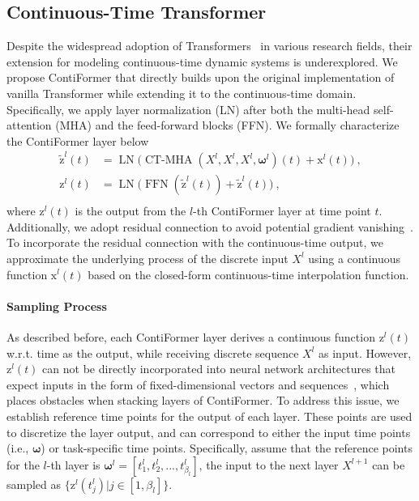 \documentclass{article}
\begin{document}
\subsection{Continuous-Time Transformer}

Despite the widespread adoption of Transformers~\cite{vaswani2017attention} in various research fields, their extension for modeling continuous-time dynamic systems is underexplored.
We propose ContiFormer that directly builds upon the original implementation of vanilla Transformer while extending it to the continuous-time domain.
Specifically, we apply layer normalization (LN) after both the multi-head self-attention (MHA) and the feed-forward blocks (FFN). 
We formally characterize the ContiFormer layer below
\begin{equation}
\begin{aligned}
 \tilde{\boldsymbol{\mathrm{z}}}^{l}(t) &= \operatorname{LN}\Big( \operatorname{CT-MHA}(X^{l}, X^{l}, X^{l}, \boldsymbol{\omega}^{l})(t)  + \boldsymbol{\mathrm{x}}^{l}(t) \Big) ~,\\
 \boldsymbol{\mathrm{z}}^{l}(t) & = \operatorname{LN}\Big( \operatorname{FFN}(\tilde{\boldsymbol{\mathrm{z}}}^{l}(t) ) + \tilde{\boldsymbol{\mathrm{z}}}^{l}(t) \Big) ~,\\
\end{aligned}
\label{eq:layer}
\end{equation}
where $\boldsymbol{\mathrm{z}}^{l}(t)$ is the output from the $l$-th ContiFormer layer at time point $t$. 
Additionally, we adopt residual connection to avoid potential gradient vanishing~\cite{he2016deep}. 
To incorporate the residual connection with the continuous-time output, we approximate the underlying process of the discrete input $X^l$ using a continuous function $\boldsymbol{\mathrm{x}}^l(t)$ based on the closed-form continuous-time interpolation function.

\paragraph{Sampling Process} 

As described before, each ContiFormer layer derives a continuous function $\boldsymbol{\mathrm{z}}^l(t)$ w.r.t. time as the output, while receiving discrete sequence $X^l$ as input.
However, $\boldsymbol{\mathrm{z}}^l(t)$ can not be directly incorporated into neural network architectures that expect inputs in the form of fixed-dimensional vectors and sequences~\cite{shukla2021multi}, which places obstacles when stacking layers of ContiFormer.
To address this issue, we establish reference time points for the output of each layer. These points are used to discretize the layer output, and can correspond to either the input time points (i.e., $\boldsymbol{\omega}$) or task-specific time points. 
Specifically, assume that the reference points for the $l$-th layer is $\boldsymbol{\omega}^{l}=[t_1^l, t_2^l, ..., t_{\beta_l}^l]$, the input to the next layer $X^{l+1}$ can be sampled as $\{ \boldsymbol{\mathrm{z}}^{l}(t_j^l) | j \in [1, \beta_l] \}$.
\end{document}
